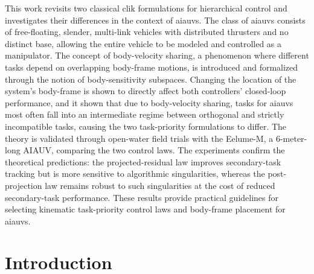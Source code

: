 \documentclass[../main.tex]{subfiles}
\begin{document}
This work revisits two classical \gls{clik} formulations for hierarchical control and investigates their differences in the context of \glspl{aiauv}. The class of \glspl{aiauv} consists of free-floating, slender, multi-link vehicles with distributed thrusters and no distinct base, allowing the entire vehicle to be modeled and controlled as a manipulator. The concept of body-velocity sharing, a phenomenon where different tasks depend on overlapping body-frame motions, is introduced and formalized through the notion of body-sensitivity subspaces. Changing the location of the system's body-frame is shown to directly affect both controllers' closed-loop performance, and it shown that due to body-velocity sharing, tasks for \glspl{aiauv} most often fall into an intermediate regime between orthogonal and strictly incompatible tasks, causing the two task-priority formulations to differ. The theory is validated through open-water field trials with the Eelume-M, a 6-meter-long AIAUV, comparing the two control laws. The experiments confirm the theoretical predictions: the projected-residual law improves secondary-task tracking but is more sensitive to algorithmic singularities, whereas the post-projection law remains robust to such singularities at the cost of reduced secondary-task performance. These results provide practical guidelines for selecting kinematic task-priority control laws and body-frame placement for \glspl{aiauv}.

\section{Introduction}

\end{document}
